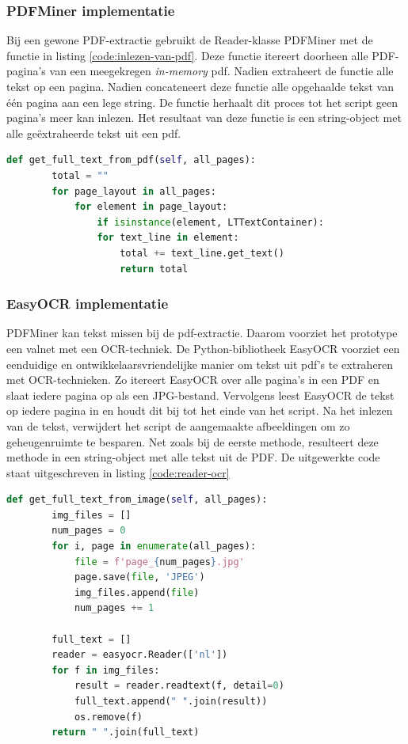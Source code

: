 \subsubsection{PDFMiner implementatie}

Bij een gewone PDF-extractie gebruikt de Reader-klasse PDFMiner met de functie in listing \ref{code:inlezen-van-pdf}. Deze functie itereert doorheen alle PDF-pagina's van een meegekregen \textit{in-memory} pdf. Nadien extraheert de functie alle tekst op een pagina. Nadien concateneert deze functie alle opgehaalde tekst van één pagina aan een lege string. De functie herhaalt dit proces tot het script geen pagina's meer kan inlezen. Het resultaat van deze functie is een string-object met alle geëxtraheerde tekst uit een pdf.

\begin{lstlisting}[language=Python, caption={Een PDF inlezen met PDFMiner}, label={code:inlezen-van-pdf}]
	def get_full_text_from_pdf(self, all_pages):
		total = ""
		for page_layout in all_pages:
			for element in page_layout:
				if isinstance(element, LTTextContainer):
				for text_line in element:
					total += text_line.get_text()
					return total
\end{lstlisting}

\subsubsection{EasyOCR implementatie}

PDFMiner kan tekst missen bij de pdf-extractie. Daarom voorziet het prototype een valnet met een OCR-techniek. De Python-bibliotheek EasyOCR voorziet een eenduidige en ontwikkelaarsvriendelijke manier om tekst uit pdf's te extraheren met OCR-technieken. Zo itereert EasyOCR over alle pagina's in een PDF en slaat iedere pagina op als een JPG-bestand. Vervolgens leest EasyOCR de tekst op iedere pagina in en houdt dit bij tot het einde van het script. Na het inlezen van de tekst, verwijdert het script de aangemaakte afbeeldingen om zo geheugenruimte te besparen. Net zoals bij de eerste methode, resulteert deze methode in een string-object met alle tekst uit de PDF. De uitgewerkte code staat uitgeschreven in listing \ref{code:reader-ocr}

\begin{lstlisting}[language=Python, caption={Een PDF inlezen met OCR}, label={code:reader-ocr}]
	def get_full_text_from_image(self, all_pages):
		img_files = []
		num_pages = 0
		for i, page in enumerate(all_pages):
			file = f'page_{num_pages}.jpg'
			page.save(file, 'JPEG')
			img_files.append(file)
			num_pages += 1
		
		full_text = []
		reader = easyocr.Reader(['nl'])
		for f in img_files:
			result = reader.readtext(f, detail=0)
			full_text.append(" ".join(result))
			os.remove(f)
		return " ".join(full_text)
\end{lstlisting}

